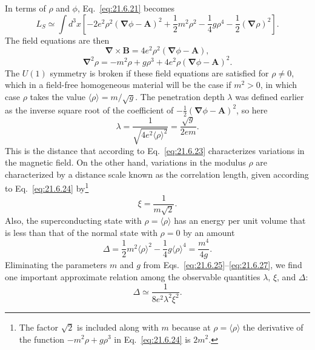 In terms of $\rho$ and $\phi$, Eq.~\eqref{eq:21.6.21} becomes
\begin{equation}
L_S\simeq\int d^3x\left[
-2e^2\rho^2(\boldsymbol\nabla\phi-\mathbf A)^2
+\frac12m^2\rho^2
-\frac14g\rho^4
-\frac12(\boldsymbol\nabla\rho)^2
\right].
\tag{21.6.22}\label{eq:21.6.22}
\end{equation}
The field equations are then
\begin{equation}
\boldsymbol\nabla\mathbin{\times}\mathbf B
=4e^2\rho^2(\boldsymbol\nabla\phi-\mathbf A),
\tag{21.6.23}\label{eq:21.6.23}
\end{equation}
\begin{equation}
\boldsymbol\nabla^2\rho
=-m^2\rho+g\rho^3
+4e^2\rho(\boldsymbol\nabla\phi-\mathbf A)^2.
\tag{21.6.24}\label{eq:21.6.24}
\end{equation}
The $U(1)$ symmetry is broken if these field equations are satisfied for $\rho\ne0$, which in a field-free homogeneous material will be the case if $m^2>0$, in which case $\rho$ takes the value $\langle\rho\rangle=m/\sqrt g$. The penetration depth $\lambda$ was defined earlier as the inverse square root of the coefficient of $-\frac12(\boldsymbol\nabla\phi-\mathbf A)^2$, so here
\begin{equation}
\lambda=\frac{1}{\sqrt{4e^2\langle\rho\rangle^2}}
=\frac{\sqrt g}{2em}.
\tag{21.6.25}\label{eq:21.6.25}
\end{equation}
This is the distance that according to Eq.~\eqref{eq:21.6.23} characterizes variations in the magnetic field. On the other hand, variations in the modulus $\rho$ are characterized by a distance scale known as the correlation length, given according to Eq.~\eqref{eq:21.6.24} by\footnote{The factor $\sqrt2$ is included along with $m$ because at $\rho=\langle\rho\rangle$ the derivative of the function $-m^2\rho+g\rho^3$ in Eq.~\eqref{eq:21.6.24} is $2m^2$.}
\begin{equation}
\xi=\frac{1}{m\sqrt2}.
\tag{21.6.26}\label{eq:21.6.26}
\end{equation}
Also, the superconducting state with $\rho=\langle\rho\rangle$ has an energy per unit volume that is less than that of the normal state with $\rho=0$ by an amount
\begin{equation}
\Delta=\frac12m^2\langle\rho\rangle^2
-\frac14g\langle\rho\rangle^4
=\frac{m^4}{4g}.
\tag{21.6.27}\label{eq:21.6.27}
\end{equation}
Eliminating the parameters $m$ and $g$ from Eqs.~\eqref{eq:21.6.25}--\eqref{eq:21.6.27}, we find one important approximate relation among the observable quantities $\lambda$, $\xi$, and $\Delta$:
\begin{equation}
\Delta\simeq\frac{1}{8e^2\lambda^2\xi^2}.
\tag{21.6.28}\label{eq:21.6.28}
\end{equation}

